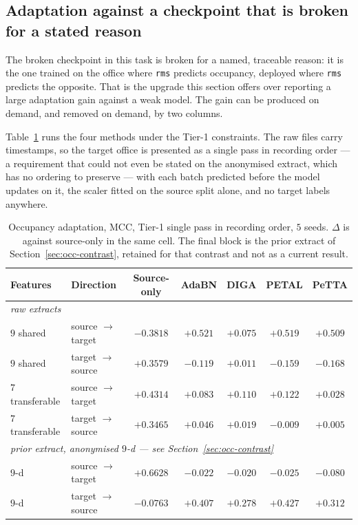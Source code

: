 \subsection{Adaptation against a checkpoint that is broken for a stated reason}
\label{sec:occ-methods}

The broken checkpoint in this task is broken for a named, traceable reason: it is the one
trained on the office where \texttt{rms} predicts occupancy, deployed where
\texttt{rms} predicts the opposite. That is the upgrade this section offers over reporting
a large adaptation gain against a weak model. The gain can be produced on demand, and
removed on demand, by two columns.

Table~\ref{tab:occmethods} runs the four methods under the Tier-1 constraints. The raw
files carry timestamps, so the target office is presented as a single pass in recording
order --- a requirement that could not even be stated on the anonymised extract, which has
no ordering to preserve --- with each batch predicted before the model updates on it, the
scaler fitted on the source split alone, and no target labels anywhere.

\begin{table}[t]
\centering
\caption{Occupancy adaptation, MCC, Tier-1 single pass in recording order, $5$ seeds.
$\Delta$ is against source-only in the same cell. The final block is the prior extract of
Section~\ref{sec:occ-contrast}, retained for that contrast and not as a current result.}
\label{tab:occmethods}
\small
\begin{tabular}{llccccc}
\toprule
Features & Direction & Source-only & AdaBN & DIGA & PETAL & PeTTA \\
\midrule
\multicolumn{7}{l}{\emph{raw extracts}} \\
\addlinespace[2pt]
$9$ shared & source $\to$ target & $-0.3818$ & $\mathbf{+0.521}$ & $+0.075$ & $+0.519$ & $+0.509$ \\
$9$ shared & target $\to$ source & $+0.3579$ & $-0.119$ & $+0.011$ & $-0.159$ & $-0.168$ \\
$7$ transferable & source $\to$ target & $+0.4314$ & $+0.083$ & $+0.110$ & $+0.122$ & $+0.028$ \\
$7$ transferable & target $\to$ source & $+0.3465$ & $+0.046$ & $+0.019$ & $-0.009$ & $+0.005$ \\
\midrule
\multicolumn{7}{l}{\emph{prior extract, anonymised $9$-d --- see Section~\ref{sec:occ-contrast}}} \\
\addlinespace[2pt]
$9$-d & source $\to$ target & $+0.6628$ & $-0.022$ & $-0.020$ & $-0.025$ & $-0.080$ \\
$9$-d & target $\to$ source & $-0.0763$ & $+0.407$ & $+0.278$ & $+0.427$ & $+0.312$ \\
\bottomrule
\end{tabular}
\end{table}

